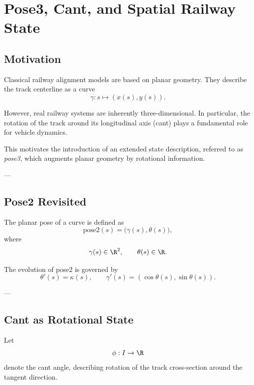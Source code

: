 \chapter{Pose3, Cant, and Spatial Railway State}

\section{Motivation}

\begin{remark}
Classical railway alignment models are based on planar geometry.
They describe the track centerline as a curve
\[
\gamma : s \mapsto (x(s),y(s)).
\]
\end{remark}

\begin{remark}
However, real railway systems are inherently three-dimensional.
In particular, the rotation of the track around its longitudinal axis
(cant) plays a fundamental role for vehicle dynamics.
\end{remark}

\begin{remark}
This motivates the introduction of an extended state description,
referred to as \emph{pose3}, which augments planar geometry by
rotational information.
\end{remark}

---

\section{Pose2 Revisited}

\begin{definition}[Pose2]
The planar pose of a curve is defined as
\[
\mathrm{pose2}(s)
=
\bigl(
\gamma(s), \theta(s)
\bigr),
\]
where
\[
\gamma(s)\in\R^2, \qquad \theta(s)\in\R.
\]
\end{definition}

\begin{remark}
The evolution of pose2 is governed by
\[
\theta'(s)=\kappa(s),
\qquad
\gamma'(s)=(\cos\theta(s),\sin\theta(s)).
\]
\end{remark}

---

\section{Cant as Rotational State}

\begin{definition}
Let
\[
\phi : I \to \R
\]
denote the cant angle, describing rotation of the track cross-section
around the tangent direction.
\end{definition}

